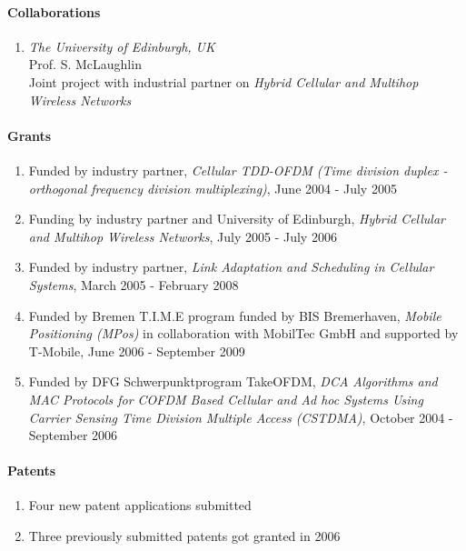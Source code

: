 \paragraph{Collaborations}
\begin{enumerate}
\item {\sl The University of Edinburgh, UK}\\
  Prof. S. McLaughlin\\
  Joint project with industrial partner on \emph{Hybrid Cellular and Multihop Wireless
    Networks}
\end{enumerate}

\newpage
\paragraph{Grants}
\begin{enumerate}
    \item Funded by industry partner,
      \emph{Cellular TDD-OFDM (Time division duplex - orthogonal frequency
          division multiplexing)},  June 2004 - July 2005


    \item Funding by industry partner and University of Edinburgh, \emph{Hybrid Cellular and Multihop Wireless
    Networks},  July 2005 - July 2006

    \item Funded by industry partner, \emph{Link Adaptation and Scheduling in Cellular
    Systems},  March 2005 - February 2008

    \item Funded by Bremen T.I.M.E program funded by BIS
    Bremerhaven, \emph{Mobile Positioning (MPos)} in collaboration with MobilTec GmbH and supported by
     T-Mobile,  June 2006 - September 2009

    \item Funded by DFG Schwerpunktprogram TakeOFDM, \emph{DCA Algorithms and MAC Protocols for COFDM Based Cellular and
     Ad hoc Systems Using Carrier Sensing Time Division Multiple Access
     (CSTDMA)},  October 2004 - September 2006

\end{enumerate}

\paragraph{Patents}
\begin{enumerate}
\item Four new patent applications submitted
\item Three previously submitted patents got granted in 2006
\end{enumerate}

